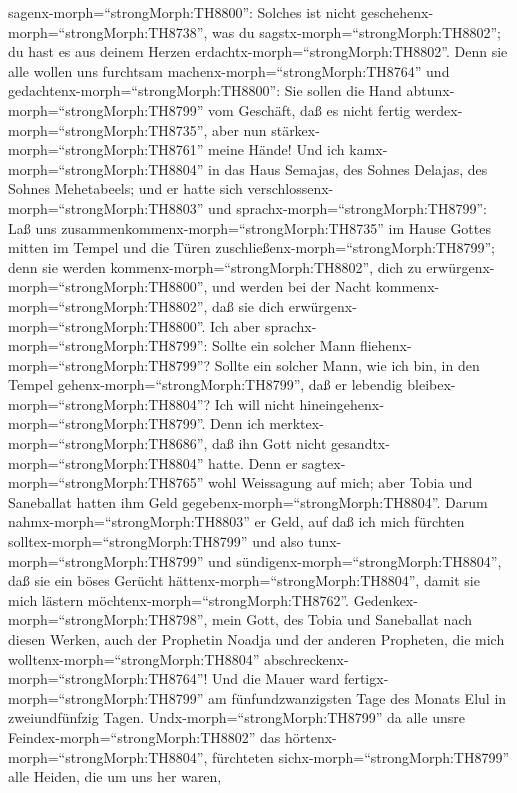 sagenx-morph=``strongMorph:TH8800'': Solches ist nicht
geschehenx-morph=``strongMorph:TH8738'', was du
sagstx-morph=``strongMorph:TH8802''; du hast es aus deinem Herzen
erdachtx-morph=``strongMorph:TH8802''.  Denn sie alle wollen
uns furchtsam machenx-morph=``strongMorph:TH8764'' und
gedachtenx-morph=``strongMorph:TH8800'': Sie sollen die Hand
abtunx-morph=``strongMorph:TH8799'' vom Geschäft, daß es nicht fertig
werdex-morph=``strongMorph:TH8735'', aber nun
stärkex-morph=``strongMorph:TH8761'' meine Hände!  Und ich
kamx-morph=``strongMorph:TH8804'' in das Haus Semajas, des Sohnes
Delajas, des Sohnes Mehetabeels; und er hatte sich
verschlossenx-morph=``strongMorph:TH8803'' und
sprachx-morph=``strongMorph:TH8799'': Laß uns
zusammenkommenx-morph=``strongMorph:TH8735'' im Hause Gottes mitten im
Tempel und die Türen zuschließenx-morph=``strongMorph:TH8799''; denn sie
werden kommenx-morph=``strongMorph:TH8802'', dich zu
erwürgenx-morph=``strongMorph:TH8800'', und werden bei der Nacht
kommenx-morph=``strongMorph:TH8802'', daß sie dich
erwürgenx-morph=``strongMorph:TH8800''.  Ich aber
sprachx-morph=``strongMorph:TH8799'': Sollte ein solcher Mann
fliehenx-morph=``strongMorph:TH8799''? Sollte ein solcher Mann, wie ich
bin, in den Tempel gehenx-morph=``strongMorph:TH8799'', daß er lebendig
bleibex-morph=``strongMorph:TH8804''? Ich will nicht
hineingehenx-morph=``strongMorph:TH8799''.  Denn ich
merktex-morph=``strongMorph:TH8686'', daß ihn Gott nicht
gesandtx-morph=``strongMorph:TH8804'' hatte. Denn er
sagtex-morph=``strongMorph:TH8765'' wohl Weissagung auf mich; aber Tobia
und Saneballat hatten ihm Geld gegebenx-morph=``strongMorph:TH8804''.
 Darum nahmx-morph=``strongMorph:TH8803'' er Geld, auf daß
ich mich fürchten solltex-morph=``strongMorph:TH8799'' und also
tunx-morph=``strongMorph:TH8799'' und
sündigenx-morph=``strongMorph:TH8804'', daß sie ein böses Gerücht
hättenx-morph=``strongMorph:TH8804'', damit sie mich lästern
möchtenx-morph=``strongMorph:TH8762''. 
Gedenkex-morph=``strongMorph:TH8798'', mein Gott, des Tobia und
Saneballat nach diesen Werken, auch der Prophetin Noadja und der anderen
Propheten, die mich wolltenx-morph=``strongMorph:TH8804''
abschreckenx-morph=``strongMorph:TH8764''!  Und die Mauer
ward fertigx-morph=``strongMorph:TH8799'' am fünfundzwanzigsten Tage des
Monats Elul in zweiundfünfzig Tagen. 
Undx-morph=``strongMorph:TH8799'' da alle unsre
Feindex-morph=``strongMorph:TH8802'' das
hörtenx-morph=``strongMorph:TH8804'', fürchteten
sichx-morph=``strongMorph:TH8799'' alle Heiden, die um uns her waren,
